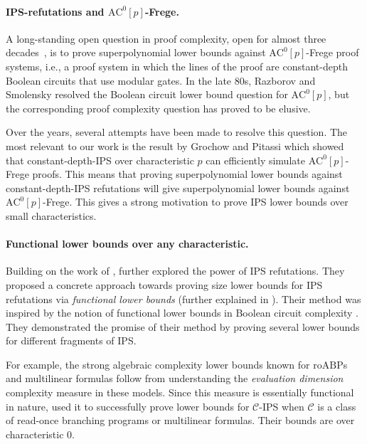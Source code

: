 \documentclass[11pt]{article}
\newcommand{\roABP}{\mathrm{roABP}}
\newcommand{\ACz}{\text{AC}^0}
\begin{document}
\paragraph{IPS-refutations and $\ACz[p]$-Frege.}
A long-standing open question in proof complexity, open for almost three decades~\cite{kra2015}, is to prove superpolynomial lower bounds against $\ACz[p]$-Frege proof systems, i.e., a proof system in which the lines of the proof are constant-depth Boolean circuits that use modular gates. In the late 80s, Razborov \cite{Razborov1987} and Smolensky \cite{Smolensky1987, Smolensky1993} resolved the Boolean circuit lower bound question for $\ACz[p]$, but the corresponding proof complexity question has proved to be elusive. 

Over the years, several attempts have been made to resolve this question. The most relevant to our work is the result by Grochow and Pitassi \cite[Theorem 3.5]{GP14} which showed that constant-depth-IPS over characteristic $p$ can efficiently simulate $\ACz[p]$-Frege proofs. This means that proving superpolynomial lower bounds against constant-depth-IPS refutations will give superpolynomial lower bounds against $\ACz[p]$-Frege. This gives a strong motivation to prove IPS lower bounds over small characteristics. 


\paragraph{Functional lower bounds over any characteristic.}
Building on the work of \cite{GP14}, \cite{FSTW21} further explored the power of IPS refutations. They proposed a concrete approach towards proving size lower bounds for IPS refutations via 
\emph{functional lower bounds} (further explained in ). Their method was inspired by the notion of functional lower bounds in Boolean circuit complexity \cite{Grigoriev-Razborov, FKS16}. They demonstrated the promise of their method by proving several lower bounds for different fragments of IPS.




For example, the strong algebraic complexity lower bounds known for $\roABP$s \cite{Nisan} and multilinear formulas \cite{Raz-2009} follow from understanding the \emph{evaluation dimension} complexity measure in these models. Since this measure is essentially functional in nature, \cite{FSTW21} used it to successfully prove lower bounds for $\mathcal{C}$-IPS when $\mathcal{C}$ is a class of read-once branching programs or multilinear formulas. Their bounds are over characteristic $0$.  
\end{document}
